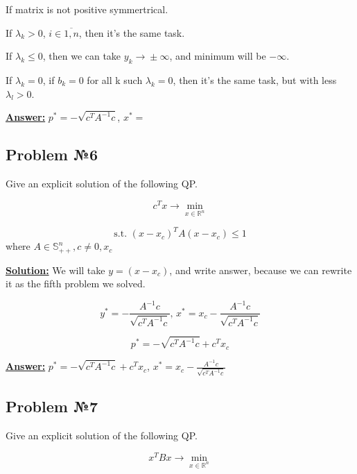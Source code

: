If matrix is not positive symmertrical.

If $\lambda_k > 0$, $i \in \overline{1, n}$, then it's the same task.

If $\lambda_k \leq 0$, then we can take $y_k \xrightarrow{} \pm \infty$, and minimum will be $-\infty$.

If $\lambda_k = 0$, if $b_k = 0$ for all k such $\lambda_k = 0$, then it's the same task, but with less $\lambda_l > 0$.

\underline{\textbf{Answer:}} $p^* = - \sqrt{c^TA^{-1}c}$, $x^* = $

\subsection{Problem №6}
Give an explicit solution of the following QP.

\begin{equation*}
    c^T x  \xrightarrow{} \min\limits_{x \in \mathds{R}^n}
\end{equation*}

\begin{equation*}
   \text{s.t. } (x-x_c)^TA(x-x_c) \leq 1
\end{equation*}
where $A \in \mathds{S}_{++}^n, c \not = 0, x_c$

\underline{\textbf{Solution:}}
We will take $y = (x-x_c)$, and write answer, because we can rewrite it as the fifth problem we solved.

\begin{equation*}
y^* = - \frac{A^{-1}c}{\sqrt{c^TA^{-1}c}}\text{, } x^* = x_c - \frac{A^{-1}c}{\sqrt{c^TA^{-1}c}}
\end{equation*}

\begin{equation*}
    p^* = - \sqrt{c^TA^{-1}c} + c^Tx_c
\end{equation*} 

\underline{\textbf{Answer:}} $p^* = - \sqrt{c^TA^{-1}c} + c^Tx_c$, $x^* = x_c - \frac{A^{-1}c}{\sqrt{c^TA^{-1}c}}$

\subsection{Problem №7}
Give an explicit solution of the following QP.

\begin{equation*}
    x^TBx  \xrightarrow{} \min\limits_{x \in \mathds{R}^n}
\end{equation*}

